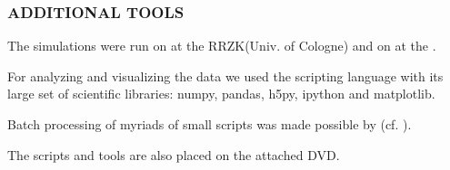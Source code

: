 \subsubsection*{ADDITIONAL TOOLS}
The simulations were run on  at the RRZK\footnotemark[1] (Univ. of Cologne)
and on \footnotemark[2] at the .

For analyzing and visualizing the data we used the  scripting
language with its large set of scientific libraries\footnotemark[3]: numpy, pandas, h5py, ipython
and matplotlib.

Batch processing of myriads of small scripts was made possible by  (cf. \cite{Tange2011a}).

The scripts and tools are also placed on the attached DVD.

